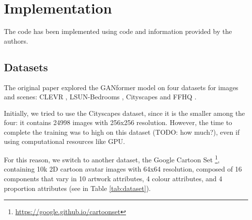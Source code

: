 \documentclass{article}
\begin{document}
	\section{Implementation}
	
	The code has been implemented using code and information provided by the authors.
	
	\subsection{Datasets}	
	The original paper \cite{hudson2021generative} explored the GANformer model on four datasets for 
	images and scenes: CLEVR \cite{johnson2017clevr}, LSUN-Bedrooms \cite{yu2015lsun}, Cityscapes 
	\cite{cordts2016cityscapes} and FFHQ \cite{karras2019style}. 
	
	Initially, we tried to use the Cityscapes dataset, since it is the smaller among the four: it contains 
	24998 images with 256x256 resolution. 
	However, the time to complete the training was to high on this dataset (TODO: how much?), even if 
	using computational resources like GPU.
	
	For this reason, we switch to another dataset, the Google Cartoon Set \cite{cartoonset}\footnote{	
	\url{https://google.github.io/cartoonset}}, containing 10k 2D cartoon avatar 
	images with 64x64 resolution, composed of 16 components that vary in 10 artwork attributes, 4 
	colour attributes, and 4 proportion attributes (see in Table \ref{tab:dataset}). 
\end{document}
